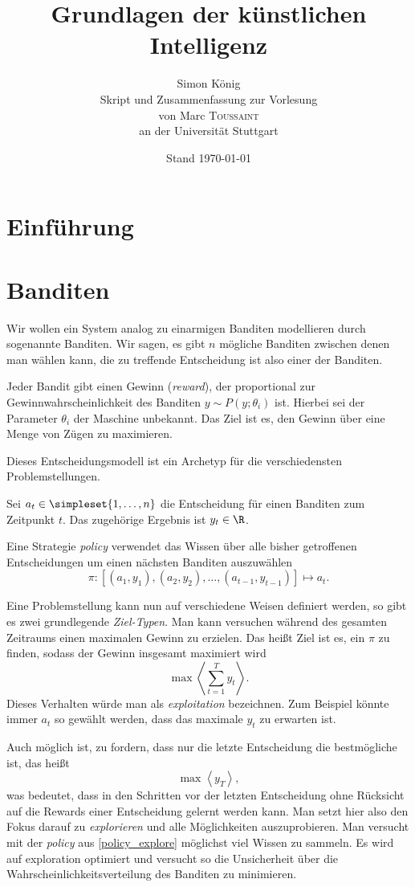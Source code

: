 \documentclass[ngerman]{../LaTeX-Templates/Paper/paper}
\title{Grundlagen der künstlichen Intelligenz}
\author{Simon König\\Skript und Zusammenfassung zur Vorlesung\\ von Marc \textsc{Toussaint}\\an der Universität Stuttgart}
\date{Stand \today}
\newcommand{\countset}[1]{\simpleset{1,\ldots,#1}}
\begin{document}
\maketitle%
\tableofcontents

\section{Einführung}
\section{Banditen}
Wir wollen ein System analog zu einarmigen Banditen modellieren durch sogenannte \glqq Banditen\grqq. Wir sagen, es gibt $n$ mögliche Banditen zwischen denen man wählen kann, die zu treffende Entscheidung ist also einer der Banditen.

Jeder Bandit gibt einen Gewinn (\emph{reward}), der proportional zur Gewinnwahrscheinlichkeit des Banditen $y\sim P(y;\theta_i)$ ist. Hierbei sei der Parameter $\theta_i$ der Maschine unbekannt. Das Ziel ist es, den Gewinn über eine Menge von Zügen zu maximieren.

Dieses Entscheidungsmodell ist ein Archetyp für die verschiedensten Problemstellungen.

\begin{definition}\label{Banditenproblem}
	Sei $a_t\in\countset n$ die Entscheidung für einen Banditen zum Zeitpunkt $t$. Das zugehörige Ergebnis ist $y_t\in\R$. 

	Eine Strategie \emph{policy} verwendet das Wissen über alle bisher getroffenen Entscheidungen um einen nächsten Banditen auszuwählen
	\begin{equation*}
		\pi:[(a_1,y_1),(a_2,y_2),\ldots,(a_{t-1},y_{t-1})]\mapsto a_t.
	\end{equation*}
\end{definition}
Eine Problemstellung kann nun auf verschiedene Weisen definiert werden, so gibt es zwei grundlegende \emph{Ziel-Typen}. Man kann versuchen während des gesamten Zeitraums einen maximalen Gewinn zu erzielen. Das heißt Ziel ist es, ein $\pi$ zu finden, sodass der Gewinn insgesamt maximiert wird
\begin{equation}
	\max\left\langle\sum_{t=1}^Ty_t\right\rangle.\label{policy_exploit}
\end{equation}
Dieses Verhalten würde man als \emph{exploitation} bezeichnen.
Zum Beispiel könnte immer $a_t$ so gewählt werden, dass das maximale $y_t$ zu erwarten ist.

Auch möglich ist, zu fordern, dass nur die letzte Entscheidung die bestmögliche ist, das heißt
\begin{equation}
	\max\left\langle y_T\right\rangle,\label{policy_explore}
\end{equation}
was bedeutet, dass in den Schritten vor der letzten Entscheidung ohne Rücksicht auf die Rewards einer Entscheidung gelernt werden kann. Man setzt hier also den Fokus darauf zu \emph{explorieren} und alle Möglichkeiten auszuprobieren.
Man versucht mit der \emph{policy} aus \autoref{policy_explore} möglichst viel Wissen zu sammeln. Es wird auf exploration optimiert und versucht so die Unsicherheit über die Wahrscheinlichkeitsverteilung des Banditen zu minimieren.
\end{document}
